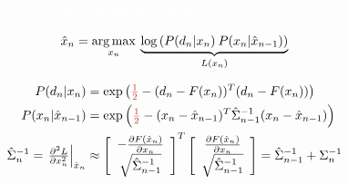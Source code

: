 \begin{algorithm}
\begin{equation*}
\begin{aligned}
{\color{white} x_n^*} &{\color{white}=\argmax_{x_n} \: \log P(d_n|x_n)}
\\
\hat{x}_n &= \argmax_{x_n} \:
\underbrace{\log \left( P(d_n|x_n) \: P(x_n |\hat{x}_{n - 1}) \right)}_{L(x_n)}   
\\
\end{aligned}
\end{equation*}

\begin{equation*}
\begin{aligned}
P(d_n|x_n) &= \exp \left( \todo{\tfrac{1}{2}} - (d_n - F(x_n))^T (d_n - F(x_n)) \right)
\\
P(x_n |\hat{x}_{n - 1}) &= \exp \left( \todo{\tfrac{1}{2}} -(x_n - \hat{x}_{n - 1})^T \hat{\Sigma}_{n - 1}^{-1} (x_n - \hat{x}_{n - 1})\right)
\\
\hat{\Sigma}_n^{-1} = 
\left.\tfrac{\partial^2 L}{\partial x_n^2}\right|_{\hat{x}_n} &\approx 
\left[
	\begin{array}{cc}
		- \tfrac{\partial F(\hat{x}_n)} {\partial x_n} \\
		\sqrt{\hat{\Sigma}_{n - 1}^{-1}} \\
	\end{array}
\right]^T 
\left[
	\begin{array}{c}
		\tfrac{\partial F(\hat{x}_n)} {\partial x_n} \\
		\sqrt{\hat{\Sigma}_{n - 1}^{-1}} \\
	\end{array}
\right] = 
\hat{\Sigma}_{n-1}^{-1}  + \Sigma_{n}^{-1}
\end{aligned}
\end{equation*}
\caption{ }
\label{alg:interframeplus}
\label{tab:iekf-like}
\end{algorithm}

